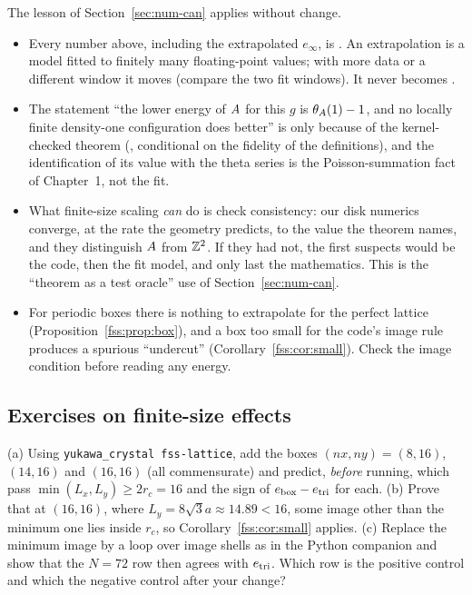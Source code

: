 The lesson of Section~\ref{sec:num-can} applies without change.
\begin{itemize}
\item Every number above, including the extrapolated $e_\infty$, is \tierX. An extrapolation is a model fitted to
finitely many floating-point values; with more data or a different window it moves (compare the two fit windows). It
never becomes \tierA.
\item The statement ``the lower energy of $A$ for this $g$ is $\theta_A(1)-1$, and no locally finite density-one
configuration does better'' is \tierA{} only because of the kernel-checked theorem
(, conditional on the fidelity of the definitions), and the identification of its
value with the theta series is the Poisson-summation fact of Chapter~1, not the fit.
\item What finite-size scaling \emph{can} do is check consistency: our disk numerics converge, at the rate the geometry
predicts, to the value the theorem names, and they distinguish $A$ from $\mathbb{Z}^2$. If they had not, the first suspects
would be the code, then the fit model, and only last the mathematics. This is the ``theorem as a test oracle'' use of
Section~\ref{sec:num-can}.
\item For periodic boxes there is nothing to extrapolate for the perfect lattice
(Proposition~\ref{fss:prop:box}), and a box too small for the code's image rule produces a spurious ``undercut''
(Corollary~\ref{fss:cor:small}). Check the image condition before reading any energy.
\end{itemize}

\subsection{Exercises on finite-size effects}

\begin{exercise}\label{fss:ex:lattice}
(a) Using \texttt{yukawa\_crystal fss-lattice}, add the boxes $(nx,ny)=(8,16)$, $(14,16)$ and $(16,16)$ (all commensurate)
and predict, \emph{before} running, which pass $\min(L_x,L_y)\ge2r_c=16$ and the sign of $e_{\rm box}-e_{\rm tri}$ for
each. (b) Prove that at $(16,16)$, where $L_y=8\sqrt3a\approx14.89<16$, some image other than the minimum one lies inside
$r_c$, so Corollary~\ref{fss:cor:small} applies. (c) Replace the minimum image by a loop over image shells as in the
Python companion and show that the $N=72$ row then agrees with $e_{\rm tri}$. Which row is the positive control and which
the negative control after your change?
\end{exercise}

